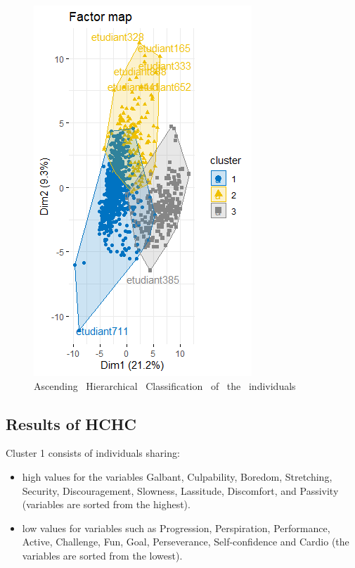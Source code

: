 \documentclass[12pt]{article}
\begin{document}
\begin{figure}[H]
\begin{center}
\includegraphics[scale=0.8]{hcpc.png} 
\caption[]{Ascending \ Hierarchical \ Classification \ of \ the \ individuals }
\end{center}
\end{figure}


\subsection{Results of HCHC}

Cluster 1 consists of individuals sharing:
\begin{itemize}
    \item  high values for the variables Galbant, Culpability, Boredom, 
Stretching, Security, Discouragement, Slowness, Lassitude,
Discomfort, and Passivity (variables are sorted from the highest).  
    
    \item  low values for variables such as Progression, Perspiration, Performance,
Active, Challenge, Fun, Goal, Perseverance, Self-confidence and Cardio 
(the variables are sorted from the lowest).

\end{itemize}
\end{document}
